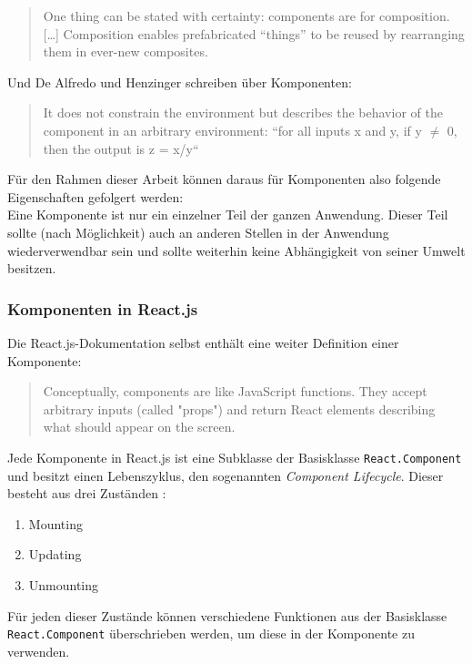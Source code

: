 \begin{quote}
  One thing can be stated with certainty: components are for composition. […] Composition enables prefabricated “things” to be reused by rearranging them in ever-new composites. \cite{Szyperski200211}
\end{quote}

Und De Alfredo und Henzinger schreiben über Komponenten:

\begin{quote}
  It does not constrain the environment but describes the behavior of the component in an arbitrary environment: “for all inputs x and y, if y $\neq$ 0, then the output is z = x/y“ \cite{de2001interface}
\end{quote}

Für den Rahmen dieser Arbeit können daraus für Komponenten also folgende Eigenschaften gefolgert werden:\\
Eine Komponente ist nur ein einzelner Teil der ganzen Anwendung. Dieser Teil sollte (nach Möglichkeit) auch an anderen Stellen in der Anwendung wiederverwendbar sein und sollte weiterhin keine Abhängigkeit von seiner Umwelt besitzen.

\subsubsection{Komponenten in React.js}
Die React.js-Dokumentation selbst enthält eine weiter Definition einer Komponente:

\begin{quote}
  Conceptually, components are like JavaScript functions. They accept arbitrary inputs (called "props") and return React elements describing what should appear on the screen. \cite{ReactProps}
\end{quote}

Jede Komponente in React.js ist eine Subklasse der Basisklasse \verb|React.Component| und besitzt einen Lebenszyklus, den sogenannten \textit{Component Lifecycle}. Dieser besteht aus drei Zuständen \cite{ReactCom}:

\begin{enumerate}
  \item Mounting
  \item Updating
  \item Unmounting
\end{enumerate}

Für jeden dieser Zustände können verschiedene Funktionen aus der Basisklasse \verb|React.Component| überschrieben werden, um diese in der Komponente zu verwenden.

